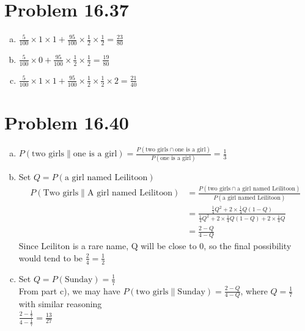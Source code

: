\documentclass{article}
\def\math#1{$#1$}
\begin{document}
\section{Problem 16.37}
\begin{enumerate}[a)]
    \item \math{\frac{5}{100} \times 1 \times 1 + \frac{95}{100} \times \frac{1}{2} \times \frac{1}{2} = \frac{23}{80}}
    \item \math{\frac{5}{100} \times 0 + \frac{95}{100} \times \frac{1}{2} \times \frac{1}{2} = \frac{19}{80}}
    \item \math{\frac{5}{100} \times 1 \times 1 + \frac{95}{100} \times \frac{1}{2} \times \frac{1}{2} \times 2 = \frac{21}{40}}
\end{enumerate}

\section{Problem 16.40}
\begin{enumerate}[a)]
    \item \math{P(\text{two girls}\|\text{one is a girl}) = \frac{P(\text{two girls} \cap \text{one is a girl})}{P(\text{one is a girl})} = \frac{1}{3}}
    \item Set \math{Q = P(\text{a girl named Leilitoon})}
    \begin{equation}
        \begin{split}
            P(\text{Two girls} \| \text{A girl named Leilitoon}) &= \frac{P(\text{two girls} \cap \text{a girl named Leilitoon})}{P(\text{a girl named Leilitoon})} \\
            &= \frac{\frac{1}{4}Q^2 + 2 \times \frac{1}{4}Q(1-Q)}{\frac{1}{4}Q^2 + 2 \times \frac{1}{4}Q(1-Q) + 2 \times \frac{1}{4}Q} \\
            &= \frac{2 - Q}{4 - Q}
        \end{split}
    \end{equation}
    Since Leiliton is a rare name, Q will be close to 0, so the final possibility would tend to be \math{\frac{2}{4} = \frac{1}{2}}
    \item Set \math{Q = P(\text{Sunday}) = \frac{1}{7}} \\
    From part c), we may have \math{P(\text{two girls} \| \text{Sunday}) = \frac{2 - Q}{4 - Q}}, where \math{Q = \frac{1}{7}} with similar reasoning\\
    \math{\frac{2 - \frac{1}{7}}{4 - \frac{1}{7}} = \frac{13}{27}}
\end{enumerate}
\end{document}
